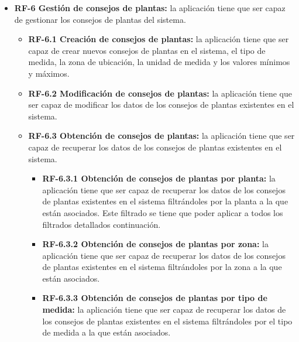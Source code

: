 \begin{itemize}
        \item \textbf{RF-6 Gestión de consejos de plantas:} la aplicación tiene que ser capaz de gestionar los consejos de plantas del sistema.
            \begin{itemize}
                \item \textbf{RF-6.1 Creación de consejos de plantas:} la aplicación tiene que ser capaz de crear nuevos consejos de plantas en el sistema, el tipo de medida, la zona de ubicación,  la unidad de medida y los valores mínimos y máximos.
                \item \textbf{RF-6.2 Modificación de consejos de plantas:} la aplicación tiene que ser capaz de modificar los datos de los consejos de plantas existentes en el sistema.
                \item \textbf{RF-6.3 Obtención de consejos de plantas:} la aplicación tiene que ser capaz de recuperar los datos de los consejos de plantas existentes en el sistema.
                \begin{itemize}
                    \item \textbf{RF-6.3.1 Obtención de consejos de plantas por planta:} la aplicación tiene que ser capaz de recuperar los datos de los consejos de plantas existentes en el sistema filtrándoles por la planta a la que están asociados. Este filtrado se tiene que poder aplicar a todos los filtrados detallados continuación. 
    				\item \textbf{RF-6.3.2 Obtención de consejos de plantas por zona:} la aplicación tiene que ser capaz de recuperar los datos de los consejos de plantas existentes en el sistema filtrándoles por la zona a la que están asociados.
    				\item \textbf{RF-6.3.3 Obtención de consejos de plantas por tipo de medida:} la aplicación tiene que ser capaz de recuperar los datos de los consejos de plantas existentes en el sistema filtrándoles por el tipo de medida a la que están asociados.
                \end{itemize}
            \end{itemize}
            

\end{itemize}
